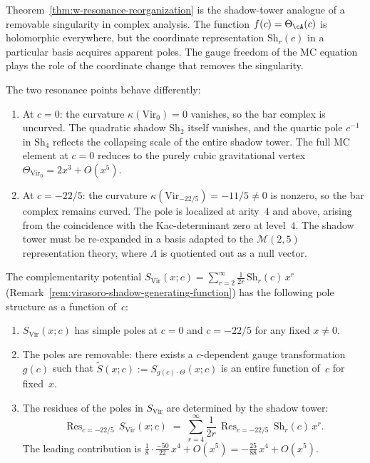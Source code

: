 \begin{remark}
\label{rem:w-removable-singularity}
Theorem~\ref{thm:w-resonance-reorganization} is the shadow-tower
analogue of a removable singularity in complex analysis.
The function $f(c) = \Theta_\cA(c)$ is holomorphic everywhere, but
the coordinate representation $\mathrm{Sh}_r(c)$ in a particular
basis acquires apparent poles.  The gauge freedom of the MC equation
plays the role of the coordinate change that removes the singularity.

The two resonance points behave differently:
\begin{enumerate}[label=\textup{(\alph*)}]
\item At $c = 0$: the curvature $\kappa(\mathrm{Vir}_0) = 0$ vanishes,
  so the bar complex is uncurved.  The quadratic shadow $\mathrm{Sh}_2$
  itself vanishes, and the quartic pole $c^{-1}$ in $\mathrm{Sh}_4$
  reflects the collapsing scale of the entire shadow tower.
  The full MC element at $c=0$ reduces to the purely cubic
  gravitational vertex $\Theta_{\mathrm{Vir}_0} = 2x^3 + O(x^5)$.
\item At $c = -22/5$: the curvature
  $\kappa(\mathrm{Vir}_{-22/5}) = -11/5 \neq 0$ is nonzero, so the
  bar complex remains curved.  The pole is localized at arity~$4$
  and above, arising from the coincidence with the Kac-determinant
  zero at level~$4$.  The shadow tower must be re-expanded in a
  basis adapted to the $\mathcal{M}(2,5)$ representation theory,
  where $\Lambda$ is quotiented out as a null vector.
\end{enumerate}
\end{remark}

\begin{corollary}
\label{cor:w-complementarity-potential-poles}
The complementarity potential
$S_{\mathrm{Vir}}(x;c) = \sum_{r=2}^\infty
\frac{1}{2r}\,\mathrm{Sh}_r(c)\,x^r$
\textup{(}Remark~\textup{\ref{rem:virasoro-shadow-generating-function})}
has the following pole structure as a function of~$c$:
\begin{enumerate}[label=\textup{(\roman*)}]
\item $S_{\mathrm{Vir}}(x;c)$ has simple poles at $c = 0$ and
  $c = -22/5$ for any fixed $x \neq 0$.
\item The poles are removable: there exists a $c$-dependent
  gauge transformation $g(c)$ such that
  $\widetilde{S}(x;c) := S_{g(c)\cdot\Theta}(x;c)$
  is an entire function of~$c$ for fixed~$x$.
\item The residues of the poles in $S_{\mathrm{Vir}}$ are determined
  by the shadow tower:
  \[
  \operatorname{Res}_{c=-22/5}\,S_{\mathrm{Vir}}(x;c)
  \;=\;
  \sum_{r=4}^{\infty}
  \frac{1}{2r}\,
  \operatorname{Res}_{c=-22/5}\,\mathrm{Sh}_r(c)\,x^r.
  \]
  The leading contribution is
  $\frac{1}{8}\cdot\frac{-50}{22}\,x^4 + O(x^5)
  = -\frac{25}{88}\,x^4 + O(x^5)$.
\end{enumerate}
\end{corollary}

